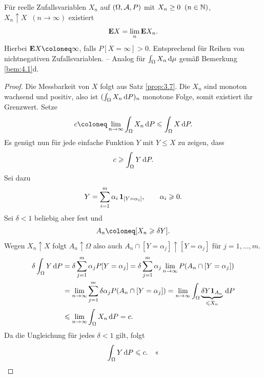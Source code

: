 \begin{prop}
\label{prop:4.3}
Für reelle
Zufallsvariablen
$X_{n}$ auf $(\Omega, \AA, P)$ mit $X_{n} \geq0 \; \; (n \in
\N)$,
$X_{n} \uparrow X \; \; (n \to \infty) $ existiert
\begin{align*}
\E X = \lim\limits_{n} \E X_{n}.
\end{align*}
Hierbei $\E X \defl \infty$, falls $P[X= \infty ] > 0$. Entsprechend für Reihen von
nichtnegativen Zufallsvariablen. -- Analog für $\int_{\Omega } X_{n}\dmu $ gemäß
Bemerkung \ref{bem:4.1}d.\fishhere
\end{prop}
\begin{proof}
Die Messbarkeit von $X$ folgt aus Satz \ref{prop:3.7}.
Die $X_n$ sind monoton wachsend und positiv, also ist $(\int_\Omega X_n\dP)_n$
monotone Folge, somit existiert ihr Grenzwert. Setze
\begin{align*}
c \defl \lim\limits_{n\to\infty}\int_\Omega X_n\dP \le \int_\Omega X\dP.
\end{align*}
Es genügt nun für jede einfache Funktion $Y$ mit $Y\le X$ zu zeigen, dass
\begin{align*}
c \ge \int_\Omega Y\dP.
\end{align*}
Sei dazu
\begin{align*}
Y = \sum\limits_{i=1}^m \alpha_i\, \Id_{[Y= \alpha_i]},\qquad \alpha_i \ge 0.
\end{align*}
Sei $\delta <1 $ beliebig aber fest und
\begin{align*}
A_n \defl [X_n\ge \delta Y].
\end{align*}
Wegen $X_n\uparrow X$ folgt $A_n\uparrow \Omega$ also auch 
$A_n\cap [Y=\alpha_j]\uparrow [Y=\alpha_j]$ für $j=1,\ldots,m$.
\begin{align*}
\delta \int_\Omega Y\dP &= \delta \sum\limits_{j=1}^m \alpha_j
P[Y=\alpha_j] = \delta \sum\limits_{j=1}^m \alpha_j
\lim\limits_{n\to\infty}P(A_n\cap[Y=\alpha_j])\\
&= \lim\limits_{n\to\infty}
\sum\limits_{j=1}^m \delta \alpha_j P(A_n\cap [Y=\alpha_j])
= \lim\limits_{n\to\infty} \int_\Omega \underbrace{\delta Y\Id_{A_n}}_{\le
X_n}\dP\\ &\le \lim\limits_{n\to\infty} \int_\Omega X_n\dP = c.
\end{align*}
Da die Ungleichung für jedes $\delta < 1$ gilt, folgt
\begin{align*}
\int_\Omega Y \dP \le c.\qedhere
\end{align*}
\end{proof}

